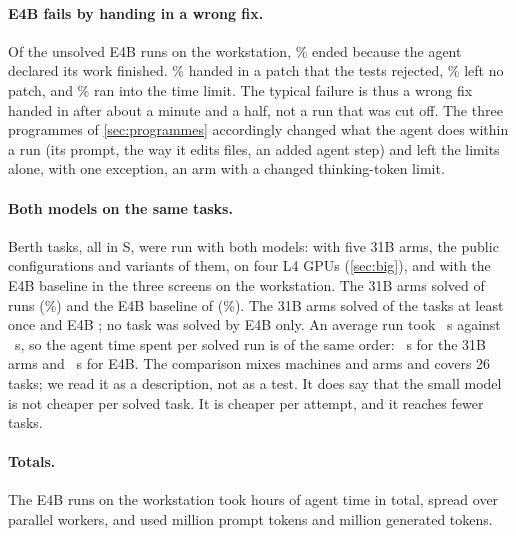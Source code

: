 \paragraph{E4B fails by handing in a wrong fix.}
Of the \WsUnsolved{} unsolved E4B runs on the workstation, \WsUnsolvedNormalPct\% ended because the agent declared its
work finished. \WsUnsolvedWrongPct\% handed in a patch that the tests rejected, \WsUnsolvedEmptyPct\% left no patch,
and \WsUnsolvedTimeoutPct\% ran into the time limit. The typical failure is thus a wrong fix handed in after about a
minute and a half, not a run that was cut off. The three programmes of \cref{sec:programmes} accordingly changed what
the agent does within a run (its prompt, the way it edits files, an added agent step) and left the limits alone,
with one exception, an arm with a changed thinking-token limit.

\paragraph{Both models on the same tasks.}
\CommonTasks{} Berth tasks, all in S, were run with both models: with five 31B arms, the public
configurations and variants of them, on four L4 GPUs (\cref{sec:big}), and with the E4B baseline in the three screens on the workstation.
The 31B arms solved \CommonBigSolved{} of \CommonBigRuns{} runs (\CommonBigPct\%) and the E4B baseline
\CommonSmallSolved{} of \CommonSmallRuns{} (\CommonSmallPct\%). The 31B arms solved \CommonBigTasks{} of the tasks at
least once and E4B \CommonSmallTasks{}; no task was solved by E4B only. An average run took \CommonBigMean{}~s
against \CommonSmallMean{}~s, so the agent time spent per solved run is of the same order: \CommonBigPerSolved{}~s for
the 31B arms and \CommonSmallPerSolved{}~s for E4B. The comparison mixes machines and arms and covers 26 tasks; we
read it as a description, not as a test. It does say that the small model is not cheaper per solved task. It is
cheaper per attempt, and it reaches fewer tasks.

\paragraph{Totals.}
The \RunsWorkstation{} E4B runs on the workstation took \WsAgentHours{} hours of agent time in total, spread over
parallel workers, and used \WsTokensInM{} million prompt tokens and \WsTokensOutM{} million generated tokens.
